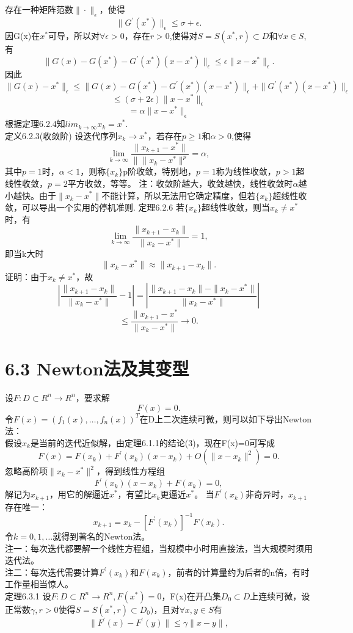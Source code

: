 \documentclass[a4paper,12pt]{article}
\begin{document}
\begin{CJK*}{UTF8}{gbsn}
	存在一种矩阵范数$\|·\|_\epsilon$，使得
	$$\|G^{'}(x^*)\|_\epsilon \leq \sigma + \epsilon.$$
	因G(x)在$x^*$可导，所以对$\forall \epsilon >0$，存在$r>0$,使得对$S=S(x^*,r)\subset D$和$\forall x\in S$,有
	$$\|G(x)-G(x^*)-G^{'}(x^*)(x-x^*)\|_\epsilon \leq \epsilon\|x-x^*\|_\epsilon.$$
	因此
	$$\|G(x)-x^*\|_\epsilon \leq \|G(x)-G(x^*) - G^{'}(x^*)(x-x^*)\|_\epsilon+\|G^{'}(x^*)(x-x^*)\|_\epsilon $$
	$$\leq (\sigma + 2\epsilon)\|x-x^*\|_\epsilon$$
	$$= \alpha\|x-x^*\|_\epsilon$$
	根据定理6.2.4知$lim_{k\to \infty}x_k=x^*$.\\
	定义6.2.3(收敛阶) 设迭代序列${x_k}\to x^*$，若存在$p\geq 1$和$\alpha > 0$,使得
	$$\lim_{k\to \infty}\frac{\|x_{k+1} - x^*\|}{\|\|x_k-x^*\|^p}=\alpha,$$
	其中$p=1$时，$\alpha <1$，则称$\{x_k\}$p阶收敛，特别地，$p=1$称为线性收敛，$p>1$超线性收敛，$p=2$平方收敛，等等。
	注：收敛阶越大，收敛越快，线性收敛时$\alpha$越小越快。由于$\|x_k-x^*\|$不能计算，所以无法用它确定精度，但若$\{x_k\}$超线性收敛，可以导出一个实用的停机准则.
	定理6.2.6 若$\{x_k\}$超线性收敛，则当$x_k\neq x^*$时，有
	$$\lim_{k\to \infty}\frac{\|x_{k+1}-x_k\|}{\|x_k-x^*\|}=1,$$
	即当k大时
	$$\|x_k-x^*\|\approx\|x_{k+1}-x_k\|.$$
	证明：由于$x_k\neq x^*$，故
	$$|\frac{\|x_{k+1}-x_k\|}{\|x_k-x^*\|}-1| = |\frac{\|x_{k+1}-x_k\|-\|x_k-x^*\|}{\|x_k-x^*\|}| $$
	$$ \leq \frac{\|x_{k+1}-x^*}{\|x_k-x^*\|} \to 0.$$
	\section{6.3 Newton法及其变型}
	设$F:D\subset R^n \to R^n$，要求解
	$$ F(x)=0.$$
	令$F(x)=(f_1(x),\ldots,f_n(x))^T$在D上二次连续可微，则可以如下导出Newton法：\\
	假设$x_k$是当前的迭代近似解，由定理6.1.1的结论(3)，现在F(x)=0可写成
	$$F(x)=F(x_k)+F^{'}(x_k)(x-x_k)+O(\|x-x_k\|^2)=0.$$
	忽略高阶项$\|x_k-x^*\|^2$，得到线性方程组
	$$F^{'}(x_k)(x-x_k)+F(x_k) = 0,$$
	解记为$x_{k+1}$，用它的解逼近$x^*$，有望比$x_k$更逼近$x^*$。
	当$F^{'}(x_k)$非奇异时，$x_{k+1}$存在唯一：
	$$x_{k+1} = x_k -[F^{'}(x_k)]^{-1}F(x_k).$$
	令$k=0,1,\ldots$就得到著名的Newton法。\\
	注一：每次迭代都要解一个线性方程组，当规模中小时用直接法，当大规模时须用迭代法。\\
	注二：每次迭代需要计算$F^{'}(x_k)$和$F(x_k)$，前者的计算量约为后者的n倍，有时工作量相当惊人。\\
	定理6.3.1 设$F:D\subset R^n \to R^n,F(x^*)=0$，F(x)在开凸集$D_0\subset D$上连续可微，设正常数$\gamma,r>0$使得$S=S(x^*,r)\subset D_0)$，且对$\forall x,y\in S$有
	$$ \|F^{'}(x)-F^{'}(y)\| \leq \gamma\|x-y\|,$$
\end{CJK*}
\end{document}
